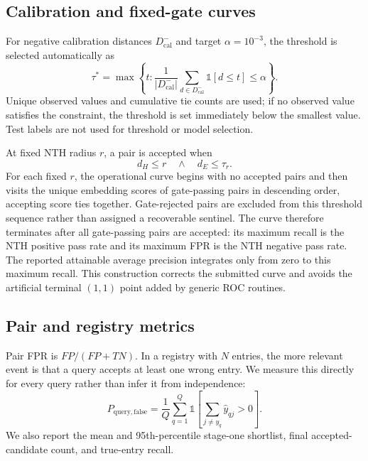 \documentclass[12pt]{article}
\begin{document}
\subsection{Calibration and fixed-gate curves}

For negative calibration distances $D^-_{\mathrm{cal}}$ and target $\alpha=10^{-3}$, the threshold is selected automatically as
\begin{equation}
 \tau^*=\max\left\{t:\frac{1}{|D^-_{\mathrm{cal}}|}\sum_{d\in D^-_{\mathrm{cal}}}\mathbb{1}[d\leq t]\leq\alpha\right\}.
\end{equation}
Unique observed values and cumulative tie counts are used; if no observed value satisfies the constraint, the threshold is set immediately below the smallest value. Test labels are not used for threshold or model selection.

At fixed NTH radius $r$, a pair is accepted when
\begin{equation}
  d_H\leq r\quad\land\quad d_E\leq\tau_r.
\end{equation}
For each fixed $r$, the operational curve begins with no accepted pairs and then visits the unique embedding scores of gate-passing pairs in descending order, accepting score ties together. Gate-rejected pairs are excluded from this threshold sequence rather than assigned a recoverable sentinel. The curve therefore terminates after all gate-passing pairs are accepted: its maximum recall is the NTH positive pass rate and its maximum FPR is the NTH negative pass rate. The reported attainable average precision integrates only from zero to this maximum recall. This construction corrects the submitted curve and avoids the artificial terminal $(1,1)$ point added by generic ROC routines.

\subsection{Pair and registry metrics}

Pair FPR is $FP/(FP+TN)$. In a registry with $N$ entries, the more relevant event is that a query accepts at least one wrong entry. We measure this directly for every query rather than infer it from independence:
\begin{equation}
  P_{\mathrm{query,false}}=\frac{1}{Q}\sum_{q=1}^{Q}\mathbb{1}\!\left[\sum_{j\ne y_q}\widehat{y}_{qj}>0\right].
\end{equation}
We also report the mean and 95th-percentile stage-one shortlist, final accepted-candidate count, and true-entry recall.
\end{document}
